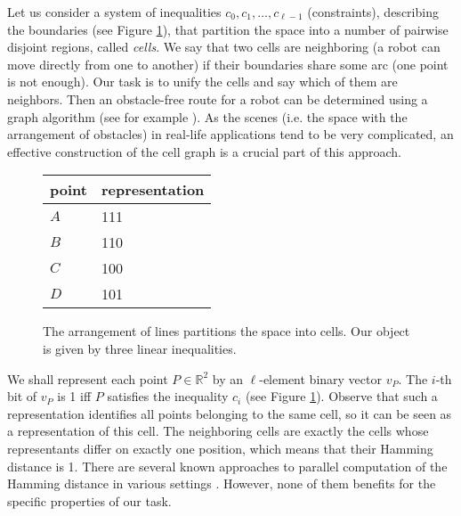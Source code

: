 \documentclass[a4paper]{article}
\begin{document}
Let us consider a system of inequalities $c_0,c_1,\ldots,c_{\ell-1}$ (constraints), describing the boundaries (see Figure \ref{fig-lines}), that
partition the space into a number of pairwise disjoint regions, called {\em cells}. We say that two cells are neighboring (a robot can move directly from one to another) if their boundaries share some arc (one point is not enough). Our task is to unify the cells and say which of them are neighbors.
Then an obstacle-free route for a robot can be determined using a graph algorithm (see for example \cite{1664021}). As the scenes (i.e. the space with the arrangement of obstacles) in real-life applications tend to be very complicated, an effective construction of the cell graph is a crucial part of this approach.




\begin{figure}[htb]
\small
\begin{center}
\raisebox{-30pt}
{
}
\hskip 1cm
\begin{tabular}{l | l}
point & representation \\ \hline
$A$ & 111 \\
$B$ & 110 \\
$C$ & 100 \\
$D$ & 101
\end{tabular}
\end{center}
\caption{The arrangement of lines partitions the space into cells. Our object is given by three linear inequalities.
}
\label{fig-lines}
\end{figure}

We shall represent each point $P \in \mathbb{R}^2$ by an $\ell$-element binary vector $v_P$. The $i$-th bit of $v_P$ is 1 iff $P$ satisfies the inequality $c_i$ (see Figure \ref{fig-lines}). 
Observe that such a representation identifies all points belonging to the same cell, so it can be seen as a representation of this cell. The neighboring cells are exactly the cells whose representants differ on exactly one position, which means that their Hamming distance is 1.
There are several known approaches to parallel computation of the Hamming distance in various settings \cite{DBLP:conf/ipps/LiuGLRL12, DBLP:conf/iros/PanLM10, Grabowski2008182}. However, none of them benefits for the specific properties of our task.
\end{document}
